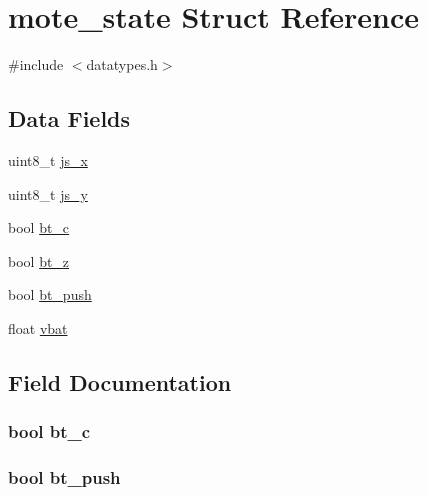 \hypertarget{structmote__state}{}\section{mote\+\_\+state Struct Reference}
\label{structmote__state}


{\ttfamily \#include $<$datatypes.\+h$>$}

\subsection*{Data Fields}
\begin{DoxyCompactItemize}
\item 
uint8\+\_\+t \hyperlink{structmote__state_a00d9e512b370d0eb769ea2ebc9a0728a}{js\+\_\+x}
\item 
uint8\+\_\+t \hyperlink{structmote__state_a9e34e0672b4949584cefd0ec606cda65}{js\+\_\+y}
\item 
bool \hyperlink{structmote__state_acd68d783e852df0a016dcafb44402f86}{bt\+\_\+c}
\item 
bool \hyperlink{structmote__state_a33ceb865cadc673b73d6c1ac14ab39e5}{bt\+\_\+z}
\item 
bool \hyperlink{structmote__state_a31889900ba8f48236feb4b32d42b28d9}{bt\+\_\+push}
\item 
float \hyperlink{structmote__state_ab3fe37f9db3ea1d893a6e9d411c5a2e8}{vbat}
\end{DoxyCompactItemize}


\subsection{Field Documentation}
\hypertarget{structmote__state_acd68d783e852df0a016dcafb44402f86}{}
\subsubsection[{bt\+\_\+c}]{\setlength{\rightskip}{0pt plus 5cm}bool bt\+\_\+c}\label{structmote__state_acd68d783e852df0a016dcafb44402f86}
\hypertarget{structmote__state_a31889900ba8f48236feb4b32d42b28d9}{}
\subsubsection[{bt\+\_\+push}]{\setlength{\rightskip}{0pt plus 5cm}bool bt\+\_\+push}\label{structmote__state_a31889900ba8f48236feb4b32d42b28d9}
\hypertarget{structmote__state_a33ceb865cadc673b73d6c1ac14ab39e5}{}
